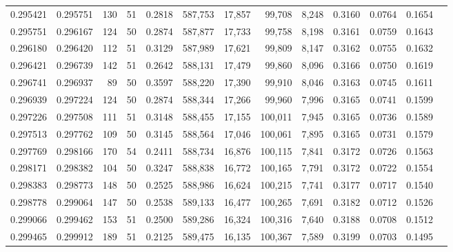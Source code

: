 \begin{tabular}{rrrrrrrrrrrrr}
0.295421 & 0.295751 &   130 &  51 &                                     0.2818 & 587,753 &  17,857 &  99,708 &   8,248 & 0.3160 & 0.0764 & 0.1654 \\
0.295751 & 0.296167 &   124 &  50 &                                     0.2874 & 587,877 &  17,733 &  99,758 &   8,198 & 0.3161 & 0.0759 & 0.1643 \\
0.296180 & 0.296420 &   112 &  51 &                                     0.3129 & 587,989 &  17,621 &  99,809 &   8,147 & 0.3162 & 0.0755 & 0.1632 \\
0.296421 & 0.296739 &   142 &  51 &                                     0.2642 & 588,131 &  17,479 &  99,860 &   8,096 & 0.3166 & 0.0750 & 0.1619 \\
0.296741 & 0.296937 &    89 &  50 &                                     0.3597 & 588,220 &  17,390 &  99,910 &   8,046 & 0.3163 & 0.0745 & 0.1611 \\
0.296939 & 0.297224 &   124 &  50 &                                     0.2874 & 588,344 &  17,266 &  99,960 &   7,996 & 0.3165 & 0.0741 & 0.1599 \\
0.297226 & 0.297508 &   111 &  51 &                                     0.3148 & 588,455 &  17,155 & 100,011 &   7,945 & 0.3165 & 0.0736 & 0.1589 \\
0.297513 & 0.297762 &   109 &  50 &                                     0.3145 & 588,564 &  17,046 & 100,061 &   7,895 & 0.3165 & 0.0731 & 0.1579 \\
0.297769 & 0.298166 &   170 &  54 &                                     0.2411 & 588,734 &  16,876 & 100,115 &   7,841 & 0.3172 & 0.0726 & 0.1563 \\
0.298171 & 0.298382 &   104 &  50 &                                     0.3247 & 588,838 &  16,772 & 100,165 &   7,791 & 0.3172 & 0.0722 & 0.1554 \\
0.298383 & 0.298773 &   148 &  50 &                                     0.2525 & 588,986 &  16,624 & 100,215 &   7,741 & 0.3177 & 0.0717 & 0.1540 \\
0.298778 & 0.299064 &   147 &  50 &                                     0.2538 & 589,133 &  16,477 & 100,265 &   7,691 & 0.3182 & 0.0712 & 0.1526 \\
0.299066 & 0.299462 &   153 &  51 &                                     0.2500 & 589,286 &  16,324 & 100,316 &   7,640 & 0.3188 & 0.0708 & 0.1512 \\
0.299465 & 0.299912 &   189 &  51 &                                     0.2125 & 589,475 &  16,135 & 100,367 &   7,589 & 0.3199 & 0.0703 & 0.1495 \\

\end{tabular}
